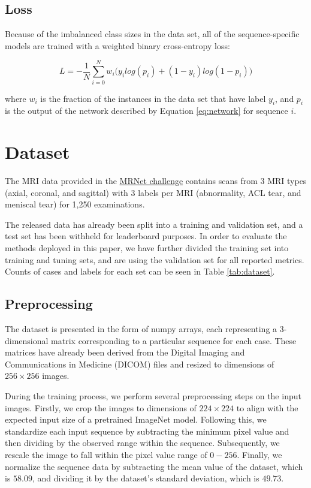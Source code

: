 \documentclass[conference]{IEEEtran}
\begin{document}
\subsection{Loss}

Because of the imbalanced class sizes in the data set, all of the sequence-specific models are trained with a weighted binary cross-entropy loss:

$$ L = -\frac{1}{N} \sum_{i=0}^N w_i \big(y_i log(p_i) + (1 - y_i) log(1 - p_i)\big)$$

where $w_i$ is the fraction of the instances in the data set that have label $y_i$, and $p_i$ is the output of the network described by Equation \ref{eq:network} for sequence $i$.

\section{Dataset} 

The MRI data provided in the \href{https://stanfordmlgroup.github.io/competitions/mrnet/}{MRNet challenge} contains scans from 3 MRI types (axial, coronal, and sagittal) with 3 labels per MRI (abnormality, ACL tear, and meniscal tear) for 1,250 examinations.

The released data has already been split into a training and validation set, and a test set has been withheld for leaderboard purposes. In order to evaluate the methods deployed in this paper, we have further divided the training set into training and tuning sets, and are using the validation set for all reported metrics. Counts of cases and labels for each set can be seen in Table \ref{tab:dataset}.

\subsection{Preprocessing}


The dataset is presented in the form of numpy arrays\cite{numpy}, each representing a 3-dimensional matrix corresponding to a particular sequence for each case. These matrices have already been derived from the Digital Imaging and Communications in Medicine (DICOM) files and resized to dimensions of $256 \times 256$ images.

During the training process, we perform several preprocessing steps on the input images. Firstly, we crop the images to dimensions of $224 \times 224$ to align with the expected input size of a pretrained ImageNet model. Following this, we standardize each input sequence by subtracting the minimum pixel value and then dividing by the observed range within the sequence. Subsequently, we rescale the image to fall within the pixel value range of $0-256$. Finally, we normalize the sequence data by subtracting the mean value of the dataset, which is $58.09$, and dividing it by the dataset's standard deviation, which is $49.73$.
\end{document}
